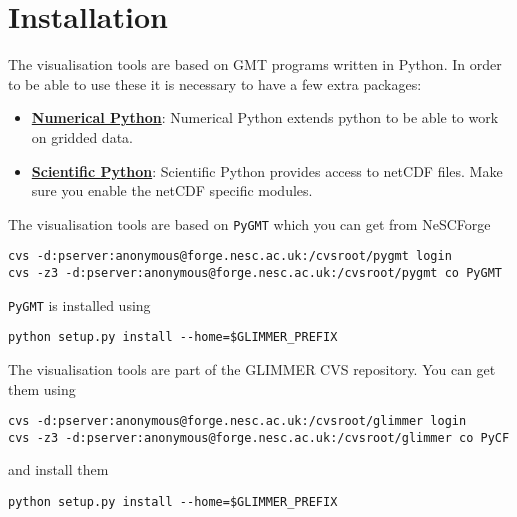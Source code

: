 \section{Installation}
The visualisation tools are based on GMT programs written in Python. In order to be able to use these it is necessary to have a few extra packages:
\begin{itemize}
\item \href{http://www.pfdubois.com/numpy/}{{\bf Numerical Python}}: Numerical Python extends python to be able to work on gridded data.
\item \href{http://starship.python.net/~hinsen/ScientificPython/}{{\bf Scientific Python}}: Scientific Python provides access to netCDF files. Make sure you enable the netCDF specific modules.
\end{itemize}

The visualisation tools are based on \texttt{PyGMT} which you can get from NeSCForge
{\small
\begin{verbatim}
cvs -d:pserver:anonymous@forge.nesc.ac.uk:/cvsroot/pygmt login
cvs -z3 -d:pserver:anonymous@forge.nesc.ac.uk:/cvsroot/pygmt co PyGMT
\end{verbatim}}
\texttt{PyGMT} is installed using
{\small
\begin{verbatim}
python setup.py install --home=$GLIMMER_PREFIX
\end{verbatim}}

The visualisation tools are part of the GLIMMER CVS repository. You can get them using
{\small
\begin{verbatim}
cvs -d:pserver:anonymous@forge.nesc.ac.uk:/cvsroot/glimmer login
cvs -z3 -d:pserver:anonymous@forge.nesc.ac.uk:/cvsroot/glimmer co PyCF
\end{verbatim}}
and install them
{\small
\begin{verbatim}
python setup.py install --home=$GLIMMER_PREFIX
\end{verbatim}}
